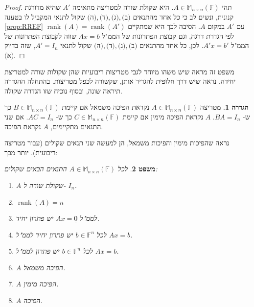 \documentclass[12pt]{report}
\theoremstyle{plain}
\newtheorem{theorem}{משפט}[chapter]
\theoremstyle{definition}
\newtheorem{definition}[theorem]{הגדרה}
\newcommand{\F}{\mathbb{F}}
\DeclareMathOperator{\rank}{rank}
\newcommand{\M}{\mathbb{M}}
\newcommand{\0}{\mathbf{0}}
\begin{document}
\begin{proof}
תהי 
$A\in\M_{n\times n}(\F)$.
היא שקולת שורה למטריצה מתאימה 
$A'$
שהיא מדורגת קנונית, ונשים לב כי כל אחד מהתנאים
$\text{(ה)},\text{(ד)},\text{(ג)},\text{(ב)}$
שקול לתנאי המקביל לו בטענה
\ref{prop:RREF}
עם
$A'$
במקום
$A$.
הסיבה לכך היא שמתקיים
$\rank(A)=\rank(A')$
לפי הגדרת דרגה, וגם קבוצת הפתרונות של הממ"ל
$Ax=b$
שווה לקבוצת הפתרונות של הממ"ל
$A'x=b'$.
לכן, כל אחד מהתנאים
$\text{(ה)},\text{(ד)},\text{(ג)},\text{(ב)}$
שקול לתנאי
$A'=I_n$,
שזה בדיוק
$\text{(א)}$.

\end{proof}

משפט זה מראה שיש משהו מיוחד לגבי מטריצות ריבועיות שהן שקולות שורה למטריצת יחידה. נראה שיש דרך חלופית להגדיר אותן, שקשורה לכפל מטריצות. בהתחלה ההגדרה תיראה שונה, ובסוף נוכיח שזו הגדרה שקולה.

\begin{definition}
מטריצה 
$A\in\M_{n\times n}(\F)$
נקראת הפיכה משמאל אם קיימת
$B\in\M_{n\times n}(\F)$
כך ש-
$BA=I_n$.
$A$
נקראת הפיכה מימין אם קיימת
$C\in\M_{n\times n}(\F)$
כך ש-
$AC=I_n$.
אם שני התנאים מתקיימים, 
$A$
נקראת הפיכה.
\end{definition}

נראה שהפיכות מימין והפיכות משמאל, הן למעשה שני תנאים שקולים (עבור מטריצה ריבועית). יותר מכך:

\begin{theorem}\label{thm:invertible}
לכל
$A\in\M_{n\times n}(\F)$
התנאים הבאים שקולים:
\begin{enumerate}[label=(\alph*)]
\item 
$A$
שקולת שורה ל-
$I_n$.


\item 
$\rank(A)=n$


\item 
לממ"ל
$Ax=\underline{0}$
יש פתרון יחיד.


\item 
לכל
$b\in\F^n$
יש פתרון יחיד לממ"ל
$Ax=b$.


\item 
לכל
$b\in\F^n$
יש פתרון לממ"ל
$Ax=b$.


\item 
$A$
הפיכה משמאל.

\item 
$A$
הפיכה מימין.

\item 
$A$
הפיכה.


\end{enumerate}
\end{theorem}
\end{document}
